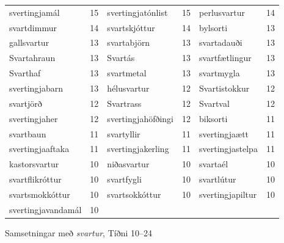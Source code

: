 \documentclass[../samsetningasafn.tex]{subfiles}
\begin{document}
\begin{wordlist}[H]
\begin{tcolorbox}
\begin{footnotesize}
\begin{tabular}{BlBlBl}
		svertingjamál & 15		& 
		svertingjatónlist & 15	& 
		perlusvartur	& 14		\\ 
		svartdimmur	& 14		& 
		svartskjóttur	& 14		& 
		bylsorti	& 13		\\ 
		gallsvartur	& 13		& 
		svartabjörn	& 13		& 
		svartadauði	& 13		\\ 
		Svartahraun	& 13		& 
		Svartás 	& 13		& 
		svartfætlingur & 13		\\ 
		Svarthaf	& 13		& 
		svartmetal	& 13		& 
		svartmygla	& 13		\\ 
		svertingjabarn & 13		& 
		hélusvartur	& 12		& 
		Svartistokkur & 12		\\ 
		svartjörð	& 12		& 
		Svartrass	& 12		& 
		Svartval	& 12		\\ 
		svertingjaher & 12		& 
		svertingjahöfðingi & 12	& 
		biksorti	& 11		\\ 
		svartbaun	& 11		& 
		svartyllir	& 11		& 
		svertingjaætt & 11		\\ 
		svertingjaaftaka & 11	& 
		svertingjakerling & 11	& 
		svertingjastelpa & 11	\\ 
		kastorsvartur & 10		& 
		niðasvartur & 10		& 
		svartaél	& 10		\\ 
		svartflikróttur & 10		& 
		svartfygli 	& 10		& 
		svartlútur	& 10		\\ 
		svartsmokkóttur & 10	& 
		svartsokkóttur & 10		& 
		svertingjapiltur & 10	\\ 
		svertingjavandamál & 10	& 
					& 	& 
					& 
	\end{tabular}
\end{footnotesize}
\end{tcolorbox}
	\caption{Samsetningar með \textit{svartur}, Tíðni 10--24}
	\label{listi:svart.10}
\end{wordlist}
\end{document}
